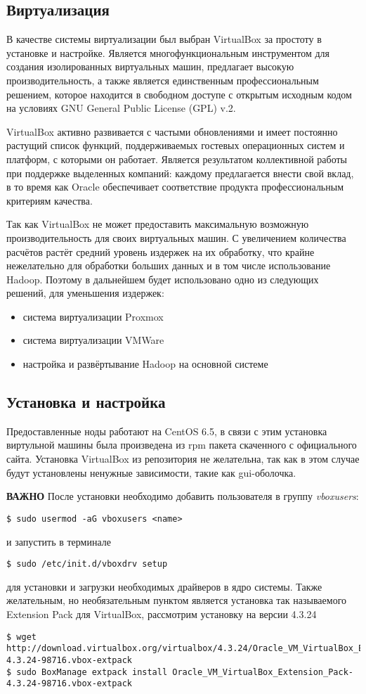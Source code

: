 \subsection{Виртуализация}
В качестве системы виртуализации был выбран VirtualBox за простоту в установке и настройке. Является 
многофункциональным инструментом для создания изолированных виртуальных машин, предлагает высокую 
производительность, а также является единственным профессиональным решением, которое находится в свободном 
доступе с открытым исходным кодом на условиях GNU General Public License (GPL) v.2.

VirtualBox активно развивается с частыми обновлениями и имеет постоянно растущий список функций, 
поддерживаемых гостевых операционных систем и платформ, с которыми он работает. Является результатом 
коллективной работы при поддержке выделенных компаний: каждому предлагается внести свой вклад, в то время 
как Oracle обеспечивает соответствие продукта профессиональным критериям качества. 

Так как VirtualBox не может предоставить максимальную возможную производительность для своих виртуальных 
машин. С увеличением количества расчётов растёт средний уровень издержек на их обработку, что крайне 
нежелательно для обработки больших данных и в том числе использование Hadoop. Поэтому в дальнейшем будет 
использовано одно из следующих решений, для уменьшения издержек:
\begin{itemize}
    \item система виртуализации Proxmox
    \item система виртуализации VMWare
    \item настройка и развёртывание Hadoop на основной системе
\end{itemize}

\subsection{Установка и настройка}
Предоставленные ноды работают на CentOS 6.5, в связи с этим установка виртульной машины была произведена из 
rpm пакета скаченного с официального сайта. Установка VirtualBox из репозитория не желательна, так как в 
этом случае будут установлены ненужные зависимости, такие как gui-оболочка.

\noindent\textbf{ВАЖНО} После установки необходимо добавить пользователя в группу \emph{vboxusers}:
\begin{lstlisting}
$ sudo usermod -aG vboxusers <name>
\end{lstlisting}
и запустить в терминале
\begin{lstlisting}
$ sudo /etc/init.d/vboxdrv setup
\end{lstlisting}
для установки и загрузки необходимых драйверов в ядро системы. Также желательным, но необязательным пунктом 
является установка так называемого Extension Pack для VirtualBox, рассмотрим установку на версии 4.3.24
\begin{lstlisting}
$ wget http://download.virtualbox.org/virtualbox/4.3.24/Oracle_VM_VirtualBox_Extension_Pack-4.3.24-98716.vbox-extpack
$ sudo BoxManage extpack install Oracle_VM_VirtualBox_Extension_Pack-4.3.24-98716.vbox-extpack
\end{lstlisting}

